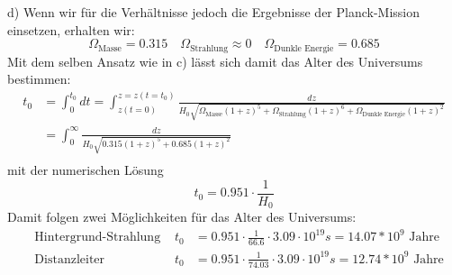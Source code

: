\documentclass[11pt, a4paper]{article}
\begin{document}
\newpage
d) Wenn wir für die Verhältnisse jedoch die Ergebnisse der Planck-Mission
einsetzen, erhalten wir:
\[
	\Omega_\text{Masse} = 0.315 \quad
	\Omega_\text{Strahlung} \approx 0 \quad
	\Omega_\text{Dunkle Energie} = 0.685
\]
Mit dem selben Ansatz wie in c) lässt sich damit das Alter des 
Universums bestimmen:
\begin{align*}
	t_0 &=
	\int_0^{t_0} dt =
	\int_{z(t = 0)}^{z = z(t = t_0)}
	\frac{dz}{ H_0 \sqrt{
		\Omega_\text{Masse} (1+z)^5 + 
		\Omega_\text{Strahlung} (1+z)^6 +
		\Omega_\text{Dunkle Energie} (1+z)^2}} \\
	&= 
	\int_{0}^{\infty}
	\frac{dz}{ H_0 \sqrt{
		0.315 (1+z)^5 + 
		0.685 (1+z)^2}} \\
\end{align*}
mit der numerischen Lösung
\[
	t_0 = 0.951 \cdot \frac1{H_0}
\]
Damit folgen zwei Möglichkeiten für das Alter des Universums:
\begin{align*}
	&\text{Hintergrund-Strahlung } &
	t_0 &= 0.951 \cdot \frac{1}{66.6} \cdot 3.09 \cdot 10^{19} s
	= 14.07 * 10^9 \text{ Jahre}
	\\
	&\text{Distanzleiter } &
	t_0 &= 0.951 \cdot \frac{1}{74.03} \cdot 3.09 \cdot 10^{19} s
	= 12.74 * 10^9 \text{ Jahre}
\end{align*}
\end{document}
